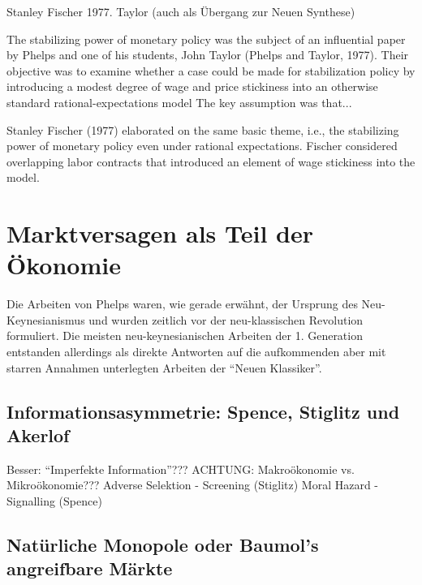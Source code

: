 Stanley Fischer 1977.
Taylor (auch als Übergang zur Neuen Synthese)

The stabilizing power of monetary policy was the subject of an influential paper by Phelps and 
one of his students, John Taylor (Phelps and Taylor, 1977). Their objective was to examine 
whether a case could be made for stabilization policy by introducing a modest degree of wage and price stickiness into an otherwise standard rational-expectations model The key 
assumption was that... \textcite[S. 12 unten]{Nobelpreis-Komitee2006}

Stanley Fischer (1977) elaborated on the same basic theme, i.e., the stabilizing power of monetary policy even  under rational expectations. Fischer considered overlapping labor contracts that introduced an element of wage stickiness into the model.


\section{Marktversagen als Teil der Ökonomie}
\label{Marktversagen}

Die Arbeiten von Phelps waren, wie gerade erwähnt, der Ursprung des Neu-Keynesianismus und wurden zeitlich vor der neu-klassischen Revolution formuliert. Die meisten neu-keynesianischen Arbeiten der 1. Generation entstanden allerdings als direkte Antworten auf die aufkommenden aber mit starren Annahmen unterlegten Arbeiten der "`Neuen Klassiker"'.


\subsection{Informationsasymmetrie: Spence, Stiglitz und Akerlof}
Besser: "`Imperfekte Information"'???
ACHTUNG: Makroökonomie vs. Mikroökonomie???
Adverse Selektion - Screening (Stiglitz)
Moral Hazard - Signalling (Spence)


\subsection{Natürliche Monopole oder Baumol's angreifbare Märkte}









